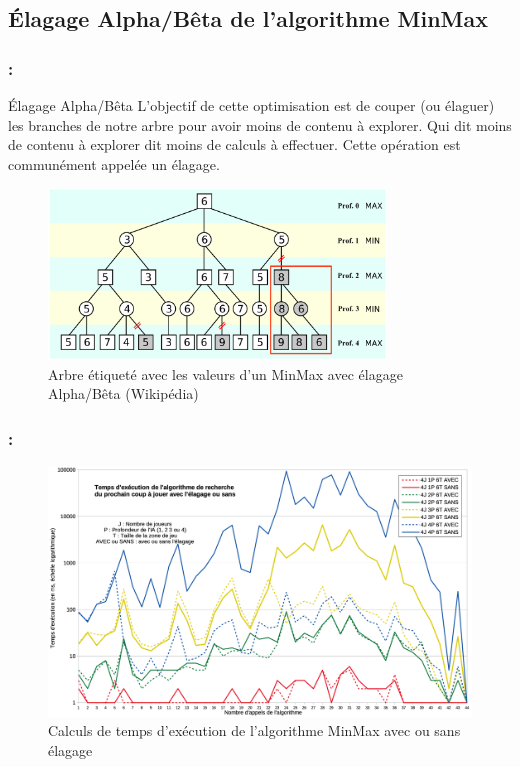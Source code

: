 \documentclass[9pt]{beamer}
\begin{document}
\subsection{Élagage Alpha/Bêta de l'algorithme MinMax}

\begin{frame}[fragile]
\frametitle{\insertsectionhead : \insertsubsectionhead}
\begin{block}{Élagage Alpha/Bêta}
L’objectif de cette optimisation est de couper (ou élaguer) les branches de notre arbre pour avoir moins de contenu à explorer. Qui dit moins de contenu à explorer dit moins de calculs à effectuer. Cette opération est communément appelée un élagage.
\end{block}
\begin{figure}[h]
    \begin{center}
        \includegraphics[width=0.8\textwidth]{figures/alphabeta.png}
        \vspace{-9px}
        \caption{Arbre étiqueté avec les valeurs d'un MinMax avec élagage Alpha/Bêta (Wikipédia)}
    \end{center}
\end{figure}
\end{frame}

\begin{frame}[fragile]
\frametitle{\insertsectionhead : \insertsubsectionhead}
\begin{figure}[h]
    \begin{center}
        \includegraphics[width=1\textwidth]{figures/temps_exec2.png}
        \vspace{-8px}
        \caption{Calculs de temps d'exécution de l’algorithme MinMax avec ou sans élagage}
    \end{center}
\end{figure}
\end{frame}
\end{document}

